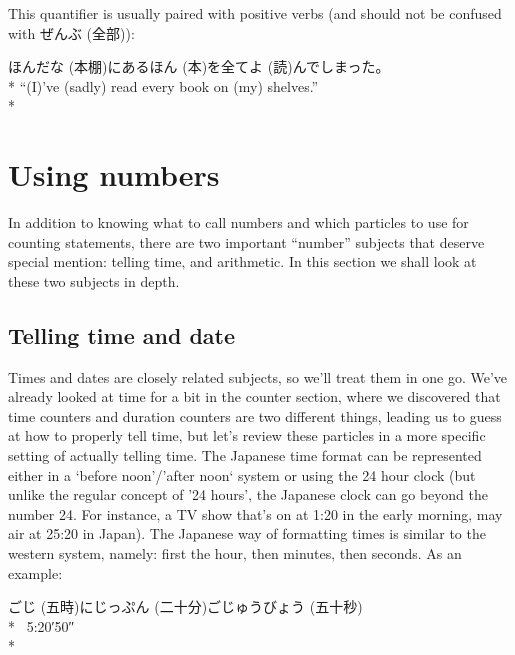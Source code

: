 \documentclass[11pt, b5paper, twoside, openright, onecolumn]{book}
\makeatletter
\newcommand*{\rubystack}[2]{{\relscale{0.5}%
  \begin{tabular}[b]{@{}c@{}}%
    {#1}\\%
   {\textscale{2}{#2}}%
  \end{tabular}}%
}
\DeclareRobustCommand*{\ruby}[2]{%
  \mbox{%
    \setlength{\parskip}{0ex}%
    \BeginAccSupp{method=pdfstringdef,ActualText={#1}}%
      \rubystack{\phantom{#2}}{#1}%
      \llap{%
        \rubystack{#2}{\phantom{#1}}%
      }%
    \EndAccSupp{}%
  }%
}
\renewcommand*{\ruby}[2]{#2 (#1)}%
\newenvironment{exampleblock}{
\setlength{\parindent}{0.6in}
\begin{minipage}[t]{\dimexpr\textwidth-\parindent}}
{\end{minipage}}
\makeatother
\begin{document}
This quantifier is usually paired with positive verbs (and should not be confused with \ruby{全部}{ぜんぶ}):

\vspace{0.4cm}
\begin{exampleblock}
\ruby{本棚}{ほんだな}にある\ruby{本}{ほん}を全て\ruby{読}{よ}んでしまった。 \\* 
“(I)’ve (sadly) read every book on (my) shelves.” \\* 
\end{exampleblock}
\section{Using numbers}


In addition to knowing what to call numbers and which particles to use for counting statements‚ there are two important “number” subjects that deserve special mention: telling time‚ and arithmetic. In this section we shall look at these two subjects in depth.

\subsection{Telling time and date}

Times and dates are closely related subjects‚ so we’ll treat them in one go. We’ve already looked at time for a bit in the counter section‚ where we discovered that time counters and duration counters are two different things‚ leading us to guess at how to properly tell time‚ but let’s review these particles in a more specific setting of actually telling time. The Japanese time format can be represented either in a ‘before noon’/’after noon‘ system or using the 24 hour clock (but unlike the regular concept of ’24 hours’‚ the Japanese clock can go beyond the number 24. For instance‚ a TV show that’s on at 1:20 in the early morning‚ may air at 25:20 in Japan).
The Japanese way of formatting times is similar to the western system‚ namely: first the hour‚ then minutes‚ then seconds. As an example:

\vspace{0.4cm}
\begin{exampleblock}
\ruby{五時}{ごじ}\ruby{二十分}{にじっぷん}\ruby{五十秒}{ごじゅうびょう} \\* 
 5:20′50″ \\* 
\end{exampleblock}
\vspace{0.2cm}
\end{document}
